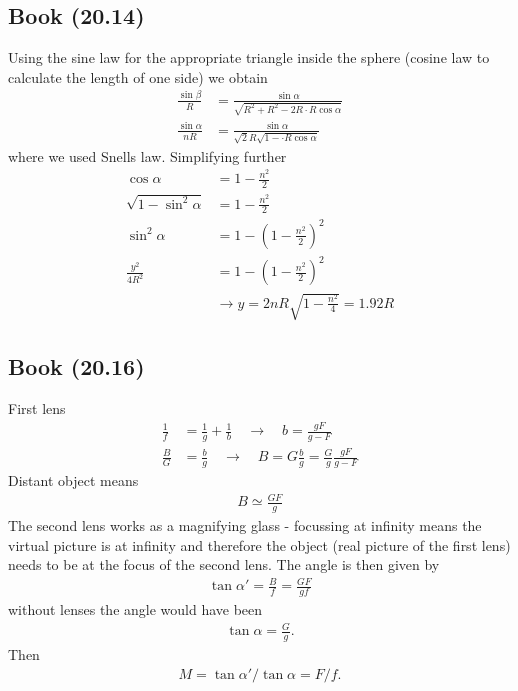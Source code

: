 \documentclass[10pt,a4paper]{book}
\theoremstyle{definition}
\begin{document}
\subsection{Book (20.14)}
Using the sine law for the appropriate triangle inside the sphere (cosine law to calculate the length of one side) we obtain
\begin{align}
\frac{\sin\beta}{R}&=\frac{\sin\alpha}{\sqrt{R^2+R^2-2R\cdot R\cos\alpha}}\\
\frac{\sin\alpha}{nR}&=\frac{\sin\alpha}{\sqrt{2}R\sqrt{1-\cdot R\cos\alpha}}
\end{align}
where we used Snells law. Simplifying further
\begin{align}
\cos\alpha&=1-\frac{n^2}{2}\\
\sqrt{1-\sin^2\alpha}&=1-\frac{n^2}{2}\\
\sin^2\alpha&=1-\left(1-\frac{n^2}{2}\right)^2\\
\frac{y^2}{4R^2}&=1-\left(1-\frac{n^2}{2}\right)^2\\
&\rightarrow y=2nR\sqrt{1-\frac{n^2}{4}}=1.92R
\end{align}

\subsection{Book (20.16)}
First lens
\begin{align}
\frac{1}{f}&=\frac{1}{g}+\frac{1}{b}\quad\rightarrow\quad b=\frac{gF}{g-F}\\
\frac{B}{G}&=\frac{b}{g}\quad\rightarrow\quad B=G\frac{b}{g}=\frac{G}{g}\frac{gF}{g-F}
\end{align}
Distant object means
\begin{align}
B\simeq\frac{GF}{g}
\end{align}
The second lens works as a magnifying glass - focussing at infinity means the virtual picture is at infinity and therefore the object (real picture of the first lens) needs to be at the focus of the second lens.
The angle is then given by
\begin{align}
\tan\alpha'=\frac{B}{f}=\frac{GF}{gf}
\end{align}
without lenses the angle would have been
\begin{align}
\tan\alpha=\frac{G}{g}.
\end{align}
Then
\begin{align}
M=\tan\alpha'/\tan\alpha=F/f.
\end{align}
\end{document}
